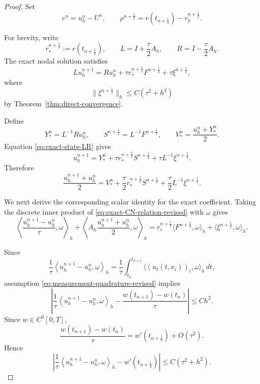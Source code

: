 \documentclass[reqno]{amsart}
\begin{document}
\begin{proof}
Set
\[
e^n=u_h^n-U^n,
\qquad
\rho^{n+\frac12}
=
r(t_{n+\frac12})-r_h^{n+\frac12}.
\]

For brevity, write
\[
r_*^{n+\frac12}:=r(t_{n+\frac12}),
\qquad
L=I+\frac{\tau}{2}A_h,
\qquad
R=I-\frac{\tau}{2}A_h.
\]
The exact nodal solution satisfies
\begin{equation}
Lu_h^{n+1}
=
Ru_h^n
+
\tau r_*^{n+\frac12}F^{n+\frac12}
+
\tau\xi^{n+\frac12},
\label{eq:exact-state-LR}
\end{equation}
where
\begin{equation}
\|\xi^{n+\frac12}\|_h
\le
C(\tau^2+h^2)
\label{eq:inverse-defect-bound}
\end{equation}
by Theorem~\ref{thm:direct-convergence}.

Define
\[
Y_*^n=L^{-1}Ru_h^n,
\qquad
S^{n+\frac12}=L^{-1}F^{n+\frac12},
\qquad
V_*^n=\frac{u_h^n+Y_*^n}{2}.
\]
Equation \eqref{eq:exact-state-LR} gives
\[
u_h^{n+1}
=
Y_*^n
+
\tau r_*^{n+\frac12}S^{n+\frac12}
+
\tau L^{-1}\xi^{n+\frac12}.
\]
Therefore
\begin{equation}
\frac{u_h^{n+1}+u_h^n}{2}
=
V_*^n
+
\frac{\tau}{2}
r_*^{n+\frac12}S^{n+\frac12}
+
\frac{\tau}{2}L^{-1}\xi^{n+\frac12}.
\label{eq:exact-midpoint-state}
\end{equation}

We next derive the corresponding scalar identity for the exact
coefficient. Taking the discrete inner product of
\eqref{eq:exact-CN-relation-revised} with \(\omega\) gives
\begin{equation}
\left\langle
\frac{u_h^{n+1}-u_h^n}{\tau},
\omega
\right\rangle_h
+
\left\langle
A_h\frac{u_h^{n+1}+u_h^n}{2},
\omega
\right\rangle_h
=
r_*^{n+\frac12}
\langle F^{n+\frac12},\omega\rangle_h
+
\langle\xi^{n+\frac12},\omega\rangle_h.
\label{eq:exact-measurement-discrete}
\end{equation}

Since
\[
\frac{1}{\tau}
\left\langle
u_h^{n+1}-u_h^n,\omega
\right\rangle_h
=
\frac{1}{\tau}
\int_{t_n}^{t_{n+1}}
\langle (u_t(t,x_i))_i,\omega\rangle_h\,dt,
\]
assumption \eqref{eq:measurement-quadrature-revised} implies
\[
\left|
\frac{1}{\tau}
\left\langle
u_h^{n+1}-u_h^n,\omega
\right\rangle_h
-
\frac{w(t_{n+1})-w(t_n)}{\tau}
\right|
\le
C h^2.
\]
Since \(w\in C^3[0,T]\),
\[
\frac{w(t_{n+1})-w(t_n)}{\tau}
=
w'(t_{n+\frac12})
+
O(\tau^2).
\]
Hence
\begin{equation}
\left|
\frac{1}{\tau}
\left\langle
u_h^{n+1}-u_h^n,\omega
\right\rangle_h
-
w'(t_{n+\frac12})
\right|
\le
C(\tau^2+h^2).
\label{eq:measurement-difference-bound}
\end{equation}


\end{proof}
\end{document}
